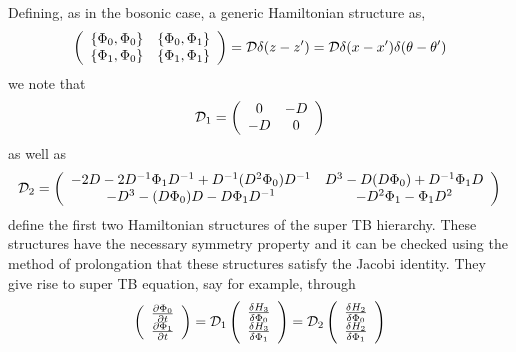 \documentclass[a4paper,11pt]{article}
\begin{document}
Defining, as in the bosonic case, a generic Hamiltonian structure as,
\begin{equation}
\left(\begin{array}{cc}
\{\Phi_{0},\Phi_{0}\} & \{\Phi_{0},\Phi_{1}\}\\
\{\Phi_{1},\Phi_{0}\} & \{\Phi_{1},\Phi_{1}\}
\end{array}\right) = {\cal D} \delta (z - z') = {\cal D} \delta
(x-x')\delta (\theta - \theta')
\end{equation}
we note that
\begin{equation}
{\cal D}_{1} = \left(\begin{array}{cc}
0 & - D\\
-D & 0
\end{array}\right)
\end{equation}
as well as
\begin{equation}
{\cal D}_{2} = \left(\begin{array}{cc}
- 2D - 2D^{-1}\Phi_{1} D^{-1} + D^{-1} (D^{2}\Phi_{0}) D^{-1} & D^{3}
- D (D\Phi_{0}) + D^{-1} \Phi_{1} D\\
- D^{3} - (D\Phi_{0}) D - D \Phi_{1} D^{-1} & - D^{2} \Phi_{1} -
\Phi_{1} D^{2}
\end{array}\right)
\end{equation}
define the first two Hamiltonian structures of the super TB
hierarchy. These structures have the necessary symmetry property and
it can be checked using the method of prolongation that these
structures satisfy the Jacobi identity. They give rise to super TB
equation, say for example, through
\begin{equation}
\left(\begin{array}{c}
{\partial \Phi_{0}\over \partial t}\\
{\partial \Phi_{1}\over \partial t}
\end{array}\right) = {\cal D}_{1} \left(\begin{array}{c}
{\delta H_{3}\over \delta \Phi_{0}}\\
{\delta H_{3}\over \delta \Phi_{1}}
\end{array}\right) = {\cal D}_{2} \left(\begin{array}{c}
{\delta H_{2}\over \delta \Phi_{0}}\\
{\delta H_{2}\over \delta \Phi_{1}}
\end{array}\right)
\end{equation}
\end{document}

